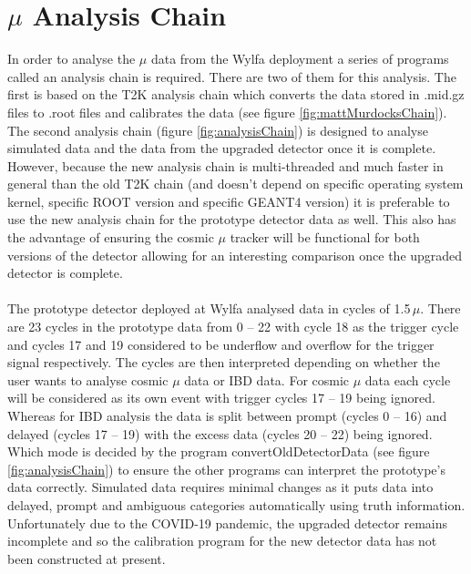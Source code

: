 \section{$\mu$ Analysis Chain}\label{sec:muonAnalysisChain}
In order to analyse the $\mu$ data from the Wylfa deployment a series of programs called an analysis chain is required. There are two of them for this analysis. The first is based on the T2K analysis chain which converts the data stored in .mid.gz files to .root files and calibrates the data (see figure \ref{fig:mattMurdocksChain}). The second analysis chain (figure \ref{fig:analysisChain}) is designed to analyse simulated data and the data from the upgraded detector once it is complete. However, because the new analysis chain is multi-threaded and much faster in general than the old T2K chain (and doesn't depend on specific operating system kernel, specific ROOT version and specific GEANT4 version) it is preferable to use the new analysis chain for the prototype detector data as well. This also has the advantage of ensuring the cosmic $\mu$ tracker will be functional for both versions of the detector allowing for an interesting comparison once the upgraded detector is complete. 
\\\\The prototype detector deployed at Wylfa analysed data in cycles of 1.5\,$\mu$. There are 23 cycles in the prototype data from 0 -- 22 with cycle 18 as the trigger cycle and cycles 17 and 19 considered to be underflow and overflow for the trigger signal respectively. The cycles are then interpreted depending on whether the user wants to analyse cosmic $\mu$ data or IBD data. For cosmic $\mu$ data each cycle will be considered as its own event with trigger cycles 17 -- 19 being ignored. Whereas for IBD analysis the data is split between prompt (cycles 0 -- 16) and delayed (cycles 17 -- 19) with the excess data (cycles 20 -- 22) being ignored. Which mode is decided by the program convertOldDetectorData (see figure \ref{fig:analysisChain}) to ensure the other programs can interpret the prototype's data correctly. Simulated data requires minimal changes as it puts data into delayed, prompt and ambiguous categories automatically using truth information. Unfortunately due to the COVID-19 pandemic, the upgraded detector remains incomplete and so the calibration program for the new detector data has not been constructed at present. 

